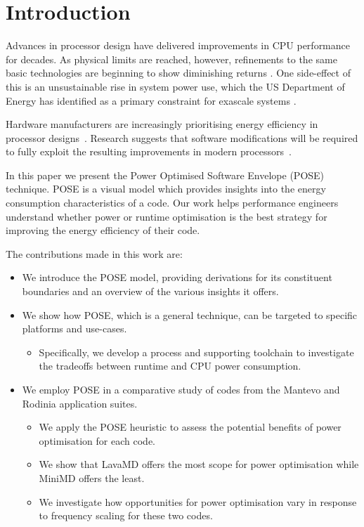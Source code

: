 \section{Introduction}
Advances in processor design have delivered improvements in CPU performance for decades. As physical limits are reached, however, refinements to the same basic technologies are beginning to show diminishing returns \cite{esmaeilzadeh:2011aa}. One side-effect of this is an unsustainable rise in system power use, which the US Department of Energy has identified as a primary constraint for exascale systems \cite{shalf:2011aa}.

Hardware manufacturers are increasingly prioritising energy efficiency in processor designs~\cite{kurd:2014aa}. 
Research suggests that software modifications will be required to fully exploit the resulting improvements in modern processors~\cite{shao:2013aa}.

In this paper we present the Power Optimised Software Envelope (POSE) technique.
POSE is a visual model which provides insights into the energy consumption characteristics of a code.
Our work helps performance engineers understand whether power or runtime optimisation is the best strategy for improving the energy efficiency of their code.

\medskip \noindent
The contributions made in this work are:
\begin{itemize}
  \item We introduce the POSE model, providing derivations for its constituent boundaries and an overview of the various insights it offers.
  \item We show how POSE, which is a general technique, can be targeted to specific platforms and use-cases. 
  \begin{itemize}
    \item Specifically, we develop a process and supporting toolchain to investigate the tradeoffs between runtime and CPU power consumption.
  \end{itemize}
  \item We employ POSE in a comparative study of codes from the Mantevo and Rodinia application suites.
  \begin{itemize}
    \item We apply the POSE heuristic to assess the potential benefits of power optimisation for each code.
    \item We show that LavaMD offers the most scope for power optimisation while MiniMD offers the least.
    \item We investigate how opportunities for power optimisation vary in response to frequency scaling for these two codes.
  \end{itemize}
\end{itemize}

